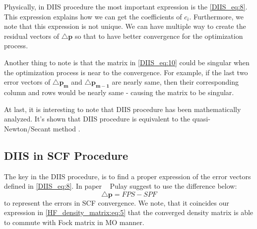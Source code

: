 Physically, in DIIS procedure the most important expression is the \ref{DIIS_eq:8}.
This expression explains how we can get the coefficients of $c_{i}$. Furthermore,
we note that this expression is not unique. We can have multiple way to create the 
residual vectors of $\triangle \mathbf{p}$ so that to have better convergence for the 
optimization process.

Another thing to note is that the matrix in \ref{DIIS_eq:10} could be singular when
the optimization process is near to the convergence. For example, if the last two
error vectors of $\triangle \mathbf{p_{m}}$ and $\triangle \mathbf{p_{m-1}}$ are 
nearly same, then their corresponding column and rows would be nearly same - causing
the matrix to be singular.

At last, it is interesting to note that DIIS procedure has been mathematically analyzed.
It's shown that DIIS procedure is equivalent to the quasi-Newton/Secant method
\cite{rohwedder2011analysis}.

\subsection{DIIS in SCF Procedure}
%
%
The key in the DIIS procedure, is to find a proper expression of the error vectors 
defined in \ref{DIIS_eq:8}. In paper ~\cite{JCC:JCC540030413} Pulay suggest to use 
the difference below:
\begin{equation}
 \label{DIIS_SCF_eq:1}
 \triangle \mathbf{p} = FPS - SPF
\end{equation}
to represent the errors in SCF convergence. We note, that it coincides our expression 
in \ref{HF_density_matrix:eq:5} that the converged density matrix is able to commute with
Fock matrix in MO manner.

